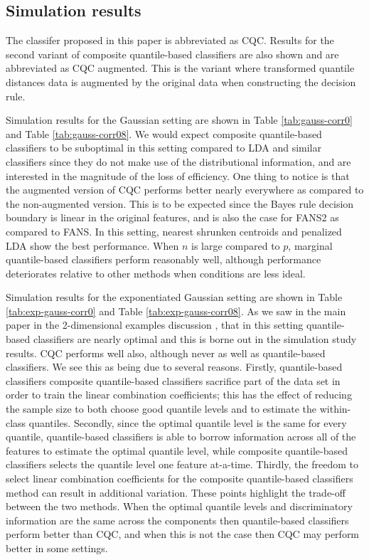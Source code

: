 \documentclass{article}
\begin{document}
\subsection{Simulation results}
\label{sec:simulation-results}

The classifer proposed in this paper is abbreviated as CQC.  Results for the
second variant of composite quantile-based classifiers are also shown and are
abbreviated as CQC augmented.  This is the variant where transformed quantile
distances data is augmented by the original data when constructing the decision
rule.

Simulation results for the Gaussian setting are shown in Table
\ref{tab:gauss-corr0} and Table \ref{tab:gauss-corr08}.  We would expect
composite quantile-based classifiers to be suboptimal in this setting compared
to LDA and similar classifiers since they do not make use of the distributional
information, and are interested in the magnitude of the loss of efficiency.  One
thing to notice is that the augmented version of CQC performs better nearly
everywhere as compared to the non-augmented version.  This is to be expected
since the Bayes rule decision boundary is linear in the original features, and
is also the case for FANS2 as compared to FANS.  In this setting, nearest
shrunken centroids and penalized LDA show the best performance.  When $n$ is
large compared to $p$, marginal quantile-based classifiers perform reasonably
well, although performance deteriorates relative to other methods when
conditions are less ideal.

Simulation results for the exponentiated Gaussian setting are shown in Table
\ref{tab:exp-gauss-corr0} and Table \ref{tab:exp-gauss-corr08}.  As we saw in
the main paper in the 2-dimensional examples discussion , that in this setting
quantile-based classifiers are nearly optimal and this is borne out in the
simulation study results.  CQC performs well also, although never as well as
quantile-based classifiers.  We see this as being due to several reasons.
Firstly, quantile-based classifiers composite quantile-based classifiers
sacrifice part of the data set in order to train the linear combination
coefficients; this has the effect of reducing the sample size to both choose
good quantile levels and to estimate the within-class quantiles.  Secondly,
since the optimal quantile level is the same for every quantile, quantile-based
classifiers is able to borrow information across all of the features to estimate
the optimal quantile level, while composite quantile-based classifiers selects
the quantile level one feature at-a-time.  Thirdly, the freedom to select linear
combination coefficients for the composite quantile-based classifiers method can
result in additional variation.  These points highlight the trade-off between
the two methods.  When the optimal quantile levels and discriminatory
information are the same across the components then quantile-based classifiers
perform better than CQC, and when this is not the case then CQC may perform
better in some settings.
\end{document}
